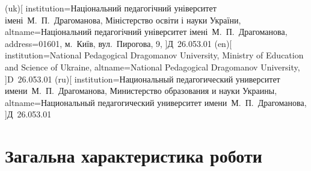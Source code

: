\documentclass[
]{mon2017dev-aref}[2019/11/16]
\theoremstyle{plain}
\theoremstyle{definition}
\theoremstyle{remark}
\begin{document}

\council(uk)[
  institution={Національний педагогічний університет імені~М.~П.~Драгоманова,
    Міністерство освіти і науки України},
  altname=Національний педагогічний університет імені~М.~П.~Драгоманова,
  address={01601, м.~Київ, вул.~Пирогова, 9},
]{Д~26.053.01}
\council(en)[
  institution={National Pedagogical Dragomanov University,
    Ministry of Education and Science of Ukraine},
  altname=National Pedagogical Dragomanov University,
]{D~26.053.01}
\council(ru)[
  institution={Национальный педагогический университет имени~М.~П.~Драгоманова,
    Министерство образования и науки Украины},
  altname=Национальный педагогический университет имени~М.~П.~Драгоманова,
]{Д~26.053.01}



\maketitle


\part{Загальна характеристика роботи}
\end{document}

